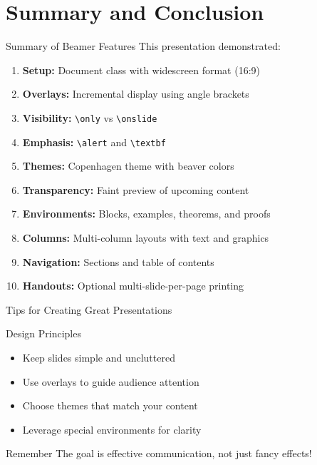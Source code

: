 \documentclass[aspectratio=169]{beamer}
\begin{document}
\section{Summary and Conclusion}

\begin{frame}{Summary of Beamer Features}
  This presentation demonstrated:
  
  \begin{enumerate}
    \item<1-> \textbf{Setup:} Document class with widescreen format (16:9)
    \item<2-> \textbf{Overlays:} Incremental display using angle brackets
    \item<3-> \textbf{Visibility:} \texttt{\textbackslash only} vs \texttt{\textbackslash onslide}
    \item<4-> \textbf{Emphasis:} \texttt{\textbackslash alert} and \texttt{\textbackslash textbf}
    \item<5-> \textbf{Themes:} Copenhagen theme with beaver colors
    \item<6-> \textbf{Transparency:} Faint preview of upcoming content
    \item<7-> \textbf{Environments:} Blocks, examples, theorems, and proofs
    \item<8-> \textbf{Columns:} Multi-column layouts with text and graphics
    \item<9-> \textbf{Navigation:} Sections and table of contents
    \item<10-> \textbf{Handouts:} Optional multi-slide-per-page printing
  \end{enumerate}
\end{frame}

\begin{frame}{Tips for Creating Great Presentations}
  \begin{block}{Design Principles}
    \begin{itemize}
      \item Keep slides simple and uncluttered
      \item Use overlays to guide audience attention
      \item Choose themes that match your content
      \item Leverage special environments for clarity
    \end{itemize}
  \end{block}
  
  \begin{alertblock}{Remember}
    The goal is effective communication, not just fancy effects!
  \end{alertblock}
\end{frame}
\end{document}
